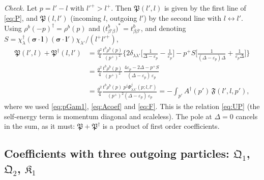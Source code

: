\documentclass[11pt,a4paper]{article}
\numberwithin{equation}{section}
\newcommand{\mf}[1]{\mathfrak{#1}}
\newcommand{\eps}{\varepsilon}
\newcommand{\dg}{\dagger}
\newcommand{\Ph}{\Phi}
\begin{document}
\emph{Check.} Let $p=l'-l$ with $l'^{+}>l^{+}$. Then $\mf P(l',l)$ is given by the first line of
\eqref{eq:P}, and $\mf P(l,l')$ (incoming $l$, outgoing $l'$) by the second line with $l\leftrightarrow l'$.
Using $\rho^{b}(-p)^{\dg}=\rho^{b}(p)$ and $\big(t^{b}_{\beta'\beta}\big)^{*}=t^{b}_{\beta\beta'}$, and denoting
$S=\chi^{\dg}_{\lambda}(\bm\sigma\!\cdot\!\bm l)(\bm\sigma\!\cdot\!\bm l')\chi_{\lambda'}/(l^{+}l'^{+})$,
\begin{align}
\mf P(l',l)+\mf P^{\dg}(l,l')&=\frac{g^{2}}{4}\frac{t^{b}\rho^{b}(p)}{(p^{+})^{2}}
\Big\{2\delta_{\lambda\lambda'}\Big[\frac{1}{\Delta-\eps_{p}}-\frac{1}{\eps_{p}}\Big]
-p^{+}S\Big[\frac{1}{(\Delta-\eps_{p})\Delta}+\frac{1}{\eps_{p}\Delta}\Big]\Big\}
\nonumber\\
&=\frac{g^{2}}{4}\frac{t^{b}\rho^{b}(p)}{(p^{+})^{2}}\,
\frac{4\eps_{p}-2\Delta-p^{+}S}{(\Delta-\eps_{p})\,\eps_{p}}
\nonumber\\
&=\frac{g^{2}}{4}\frac{t^{b}\rho^{b}(p)\;p^{j}\Ph^{j}_{\lambda\lambda'}(p;l,l')}{(p^{+})^{2}(\Delta-\eps_{p})\,\eps_{p}}
=-\int_{p'}A^{\dg}(p')\,\mf F(l',l,p'),
\end{align}
where we used \eqref{eq:pGam1}, \eqref{eq:Acoef} and \eqref{eq:F}. This is the relation \eqref{eq:UP} (the
self-energy term is momentum diagonal and scaleless). The pole at $\Delta=0$ cancels in the sum, as
it must: $\mf P+\mf P^{\dg}$ is a product of first order coefficients.

\subsection{Coefficients with three outgoing particles: $\mf Q_{1}$, $\mf Q_{2}$, $\mf K_{1}$}
\end{document}

